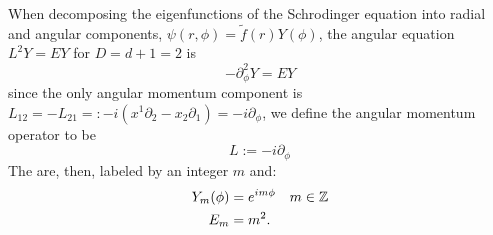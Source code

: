     
    

\linea

When decomposing the eigenfunctions of the Schrodinger equation into radial and angular components, $\psi(r, \phi) = \tilde f(r) Y(\phi)$, the angular equation $L^2 Y = EY$ for $D = d+1 = 2$ is 
\begin{equation}
    - \partial_\phi^2 Y = E Y
\end{equation}
since the only angular momentum component is $L_{12} = - L_{21} =:-i(x^1 \partial_2  - x_2 \partial_1) = - i \partial_\phi$, we define the angular momentum operator to be
\begin{equation}\label{equationAngularMomentumD2d1PartialPhi}
    L:= -i \partial_\phi    
\end{equation}
The  are, then, labeled by an integer $m$ and:
\begin{align}
    Y_m(\phi) &= e^{im \phi} & m \in \ZZ\\
    E_m &= m^2.
\end{align}

\lin

